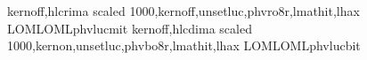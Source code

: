 



\installfonts
      {kernoff,hlcrima scaled 1000,kernoff,unsetluc,phvro8r,lmathit,lhax}
      {LOML}{OML}{phvluc}{m}{it}{}
      {kernoff,hlcdima scaled 1000,kernon,unsetluc,phvbo8r,lmathit,lhax}
      {LOML}{OML}{phvluc}{b}{it}{}
 \endinstallfonts

\bye
